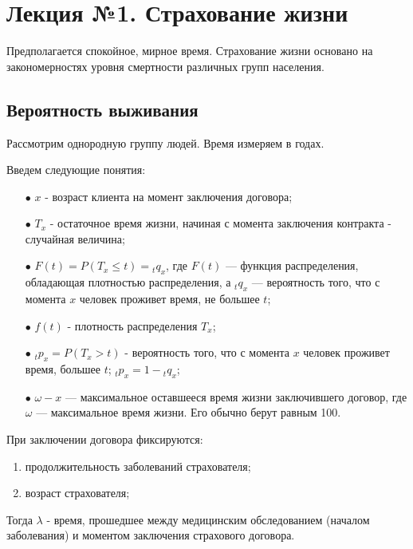 \chapter{Лекция №1. Страхование жизни}\label{lec:1}


\begin{remark}
	Предполагается спокойное, мирное время. Страхование жизни основано на закономерностях уровня смертности различных групп населения.
\end{remark}

\section{Вероятность выживания} %
\label{lec:1sec:alive_prob}

Рассмотрим однородную группу людей. Время измеряем в годах.

\begin{definition}
	Введем следующие понятия:
	\begin{itemize}
		\item[$\bullet$] 
			$x$ - возраст клиента на момент заключения договора;
		\item[$\bullet$] 
			$T_x$ - остаточное время жизни, начиная с момента заключения контракта - случайная величина;
		\item[$\bullet$] 
			$F(t) = P(T_x \leq t) = {}_{t}q_x$, где $F(t)$ — функция распределения, обладающая плотностью распределения, а ${}_{t}q_x$ — вероятность того, что с момента $x$ человек проживет время, не большее $t$;
		\item[$\bullet$] 
			$f(t)$ - плотность распределения $T_x$;
		\item[$\bullet$] 
			${}_{t}p_x = P(T_x > t)$ - вероятность того, что с момента $x$ человек проживет время, большее $t$; ${}_{t}p_x = 1 - {}_{t}q_x$;
		\item[$\bullet$] 
			$\omega - x$ — максимальное оставшееся время жизни заключившего договор, где $\omega$ — максимальное время жизни. Его обычно берут равным 100.
	\end{itemize}
\end{definition}

\begin{definition}
	При заключении договора фиксируются:
	\begin{enumerate}
		\item продолжительность заболеваний страхователя;
		\item возраст страхователя;
	\end{enumerate}

	Тогда $\lambda$ - время, прошедшее между медицинским обследованием (началом заболевания) и моментом заключения страхового договора.
\end{definition}
	


